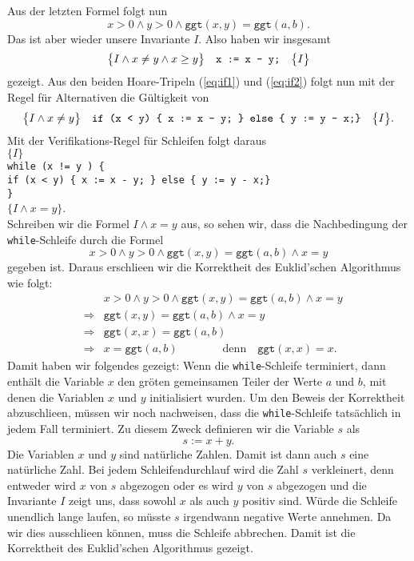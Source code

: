 Aus der letzten Formel folgt nun
\[ x > 0 \wedge y > 0 \wedge \texttt{ggt}(x,y) = \texttt{ggt}(a,b). \]
Das ist aber wieder unsere Invariante $I$.  Also haben wir insgesamt
\begin{equation}
  \label{eq:if2}
  \bigl\{I \wedge x \not= y \wedge x \geq y\bigr\}\quad\texttt{x := x - y;}\quad\bigl\{I\bigr\} 
\end{equation}
gezeigt.  Aus den beiden Hoare-Tripeln (\ref{eq:if1}) und (\ref{eq:if2})
folgt nun mit der Regel f\"ur Alternativen die G\"ultigkeit von
\[
  \bigl\{I \wedge x \not= y\bigr\}\quad\texttt{if (x < y) \{ x := x - y; \} else \{ y := y - x;\}}\quad\bigl\{I\bigr\}. 
\]
Mit der Verifikations-Regel f\"ur Schleifen folgt daraus
\\[0.2cm]
\hspace*{1.3cm} 
$\{ I \}$
\\[0.1cm]
\hspace*{2.2cm}
\texttt{while (x != y ) \{} \\[0.1cm]
\hspace*{3.2cm}
         \texttt{if (x < y) \{ x := x - y; \} else \{ y := y - x;\}}
\\[0.1cm]
\hspace*{2.2cm}
\texttt{\}} \quad 
\\[0.1cm]
\hspace*{1.3cm}
$\{ I \wedge x = y \}$. 
\\[0.2cm]
Schreiben wir die Formel $I \wedge x = y$ aus, so sehen wir, dass die Nachbedingung der
\texttt{while}-Schleife durch die Formel
\[ 
   x > 0 \wedge y > 0 \wedge \texttt{ggt}(x,y) = \texttt{ggt}(a,b) \wedge x = y
\]
gegeben ist.  Daraus erschlie\3en wir die Korrektheit des Euklid'schen Algorithmus wie folgt:
\begin{eqnarray*}
&             &  x > 0 \wedge y > 0 \wedge \texttt{ggt}(x,y) = \texttt{ggt}(a,b) \wedge x = y \\
& \Rightarrow & \texttt{ggt}(x,y) = \texttt{ggt}(a,b) \wedge x = y \\
& \Rightarrow & \texttt{ggt}(x,x) = \texttt{ggt}(a,b)  \\
& \Rightarrow & x = \texttt{ggt}(a,b) \qquad\qquad \mathrm{denn} \quad \texttt{ggt}(x,x) = x.
\end{eqnarray*}
Damit haben wir folgendes gezeigt:  Wenn die \texttt{while}-Schleife terminiert, dann
enth\"alt die Variable $x$ den gr\"o\3ten gemeinsamen Teiler der Werte $a$ und $b$, mit denen
die Variablen $x$ und $y$ initialisiert wurden.  Um den Beweis der Korrektheit
abzuschlie\3en, m\"ussen wir noch nachweisen, dass die \texttt{while}-Schleife tats\"achlich in
jedem Fall terminiert.  Zu diesem Zweck definieren wir die Variable $s$ als
\[ s := x + y. \]
Die Variablen $x$ und $y$ sind nat\"urliche Zahlen.  Damit ist dann auch $s$ eine nat\"urliche Zahl.
Bei jedem Schleifendurchlauf wird die Zahl $s$ verkleinert, denn entweder wird $x$ von $s$
abgezogen oder es wird $y$ von $s$ abgezogen und die Invariante $I$ zeigt uns, dass sowohl $x$ als auch $y$
positiv sind.  W\"urde die Schleife unendlich lange laufen, so m\"usste $s$ irgendwann negative
Werte annehmen.  Da wir dies ausschlie\3en k\"onnen, muss die
Schleife abbrechen.  Damit ist die Korrektheit des Euklid'schen Algorithmus gezeigt.
\pagebreak


